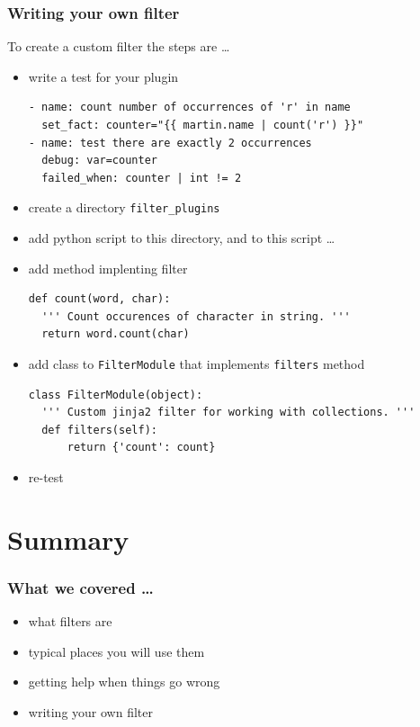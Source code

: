 \documentclass[pdf]{beamer}
\begin{document}
\begin{frame}[fragile]
  \frametitle{Writing your own filter}
  To create a custom filter the steps are \ldots
  \begin{itemize}[<+->]
    \item \alert<1>{write a test for your plugin}
      \begin{lstlisting}
- name: count number of occurrences of 'r' in name
  set_fact: counter="{{ martin.name | count('r') }}"
- name: test there are exactly 2 occurrences
  debug: var=counter
  failed_when: counter | int != 2
      \end{lstlisting}
    \item \alert<2>{create a directory \texttt{filter\_plugins}}
    \item \alert<3>{add python script to this directory, and to this script \ldots}
    \item[] \alert<4>{add method implenting filter}
      \begin{lstlisting}
def count(word, char):
  ''' Count occurences of character in string. '''
  return word.count(char)
      \end{lstlisting}
    \item[] \alert<5>{add class to \texttt{FilterModule} that implements \texttt{filters} method}
      \begin{lstlisting}
class FilterModule(object):
  ''' Custom jinja2 filter for working with collections. '''
  def filters(self):
      return {'count': count}
      \end{lstlisting}
    \item \alert<6>{re-test}
  \end{itemize}
\end{frame}

\section{Summary}

\begin{frame}
  \frametitle{What we covered \ldots}
    \pause{}
  \begin{itemize}
    \item{what filters are}
      \pause{}
    \item{typical places you will use them}
      \pause{}
    \item{getting help when things go wrong}
      \pause{}
    \item{writing your own filter}
  \end{itemize}
\end{frame}
\end{document}
